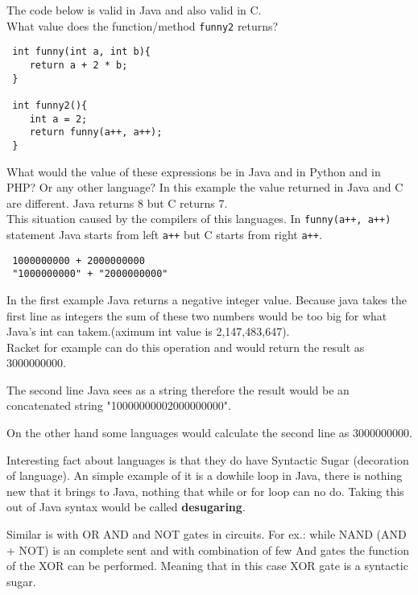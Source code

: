 \documentclass{article}
\begin{document}
\begin{flushleft}
The code below is valid in Java and also valid in C. \\
What value does the function/method \verb|funny2| returns?

\begin{verbatim}
 int funny(int a, int b){
    return a + 2 * b;
 }
 
 int funny2(){
    int a = 2;
    return funny(a++, a++);
 }
\end{verbatim}


What would the value of these expressions be in Java and in Python and in PHP? Or any other language?
In this example the value returned in Java and C are different. Java returns 8 but C returns 7.\\
This situation caused by the compilers of this languages. In \verb|funny(a++, a++)| statement Java starts from left \verb|a++| but C starts from right \verb|a++|.\linebreak


\begin{verbatim}
 1000000000 + 2000000000
 "1000000000" + "2000000000"
\end{verbatim}

In the first example Java returns a negative integer value. Because java takes the first line as integers the sum of these two numbers would be too big for what Java's int can takem.(aximum int value is 2,147,483,647).\\

Racket for example can do this operation and would return the result as 3000000000.


The second line Java sees as a string therefore the result would be an concatenated string "10000000002000000000".

On the other hand some languages would calculate the second line as 3000000000.




\setlength{\parindent}{10ex}




\par Interesting fact about languages is that they do have Syntactic Sugar (decoration of language). An simple example of it is a dowhile loop in Java, there is nothing new that it brings to Java, nothing that while or for loop can no do. Taking this out of Java syntax would be called \textbf{desugaring}.

\noindent
Similar is with OR AND and NOT gates in circuits. For ex.: while NAND (AND + NOT) is an complete sent and with combination of few And gates the function of the XOR can be performed. Meaning that in this case XOR gate is a syntactic sugar.




\end{flushleft}
\end{document}
